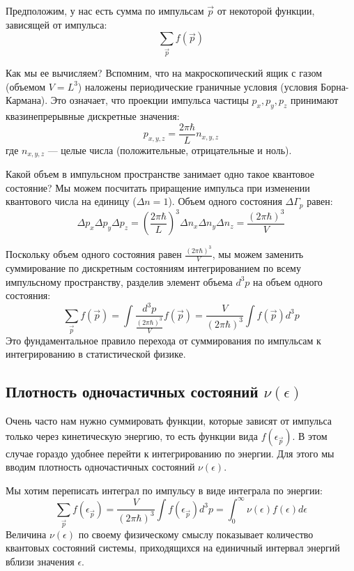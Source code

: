 \documentclass[../general/general]{subfiles}
\begin{document}
Предположим, у нас есть сумма по импульсам $\vec{p}$ от некоторой функции, зависящей от импульса:
\begin{equation}
    \sum_{\vec{p}} f(\vec{p})
\end{equation}

Как мы ее вычисляем? Вспомним, что на макроскопический ящик с газом (объемом $V = L^3$) наложены периодические граничные условия (условия Борна-Кармана). Это означает, что проекции импульса частицы $p_x, p_y, p_z$ принимают квазинепрерывные дискретные значения:
\begin{equation}
    p_{x,y,z} = \frac{2\pi\hbar}{L} n_{x,y,z}
\end{equation}
где $n_{x,y,z}$ — целые числа (положительные, отрицательные и ноль).

Какой объем в импульсном пространстве занимает одно такое квантовое состояние? Мы можем посчитать приращение импульса при изменении квантового числа на единицу ($\Delta n = 1$). Объем одного состояния $\Delta \Gamma_p$ равен:
\begin{equation}
    \Delta p_x \Delta p_y \Delta p_z = \left(\frac{2\pi\hbar}{L}\right)^3 \Delta n_x \Delta n_y \Delta n_z = \frac{(2\pi\hbar)^3}{V}
\end{equation}

Поскольку объем одного состояния равен $\frac{(2\pi\hbar)^3}{V}$, мы можем заменить суммирование по дискретным состояниям интегрированием по всему импульсному пространству, разделив элемент объема $d^3p$ на объем одного состояния:
\begin{equation}
    \sum_{\vec{p}} f(\vec{p}) = \int \frac{d^3p}{\frac{(2\pi\hbar)^3}{V}} f(\vec{p}) = \frac{V}{(2\pi\hbar)^3} \int f(\vec{p}) d^3p
\end{equation}
Это фундаментальное правило перехода от суммирования по импульсам к интегрированию в статистической физике.

\subsection{Плотность одночастичных состояний $\nu(\epsilon)$}

Очень часто нам нужно суммировать функции, которые зависят от импульса только через кинетическую энергию, то есть функции вида $f(\epsilon_{\vec{p}})$. В этом случае гораздо удобнее перейти к интегрированию по энергии. Для этого мы вводим плотность одночастичных состояний $\nu(\epsilon)$. 

Мы хотим переписать интеграл по импульсу в виде интеграла по энергии:
\begin{equation}
    \sum_{\vec{p}} f(\epsilon_{\vec{p}}) = \frac{V}{(2\pi\hbar)^3} \int f(\epsilon_{\vec{p}}) d^3p = \int_0^\infty \nu(\epsilon) f(\epsilon) d\epsilon
\end{equation}
Величина $\nu(\epsilon)$ по своему физическому смыслу показывает количество квантовых состояний системы, приходящихся на единичный интервал энергий вблизи значения $\epsilon$.
\end{document}
